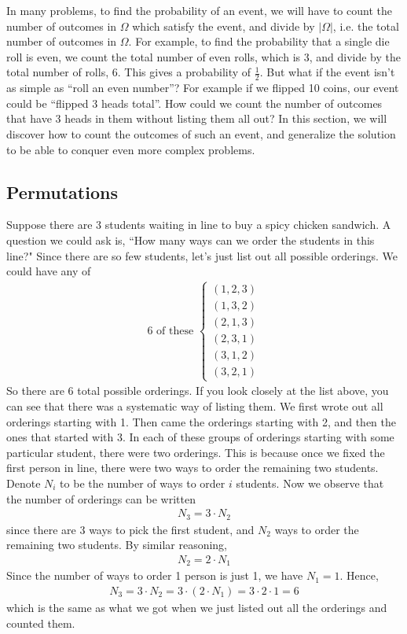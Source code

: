 \documentclass{tufte-book}
\theoremstyle{definition}
\numberwithin{theorem}{section}
\numberwithin{definition}{section}
\numberwithin{lemma}{section}
\numberwithin{corollary}{section}
\numberwithin{proposition}{section}
\numberwithin{remark}{section}
\numberwithin{claim}{section}
\numberwithin{observation}{section}
\numberwithin{fact}{section}
\numberwithin{assumption}{section}
\numberwithin{example}{section}
\numberwithin{exercise}{section}
\begin{document}
In many problems, to find the probability of an event, we will have to count the number of outcomes in $\Omega$ which satisfy the event, and divide by $|\Omega|$, i.e. the total number of outcomes in $\Omega$. For example, to find the probability that a single die roll is even, we count the total number of even rolls, which is 3, and divide by the total number of rolls, 6. This gives a probability of $\frac{1}{2}$. But what if the event isn't as simple as ``roll an even number''? For example if we flipped 10 coins, our event could be ``flipped 3 heads total''. How could we count the number of outcomes that have 3 heads in them without listing them all out? In this section, we will discover how to count the outcomes of such an event, and generalize the solution to be able to conquer even more complex problems.

\subsection{Permutations}
Suppose there are 3 students waiting in line to buy a spicy chicken sandwich. A question we could ask is, ``How many ways can we order the students in this line?" Since there are so few students, let's just list out all possible orderings. We could have any of
\begin{align*}
\text{6 of these }\begin{cases}
(1,2,3) \\
(1,3,2) \\
(2,1,3) \\
(2,3,1) \\
(3,1,2) \\
(3,2,1) 
\end{cases}
\end{align*}
So there are 6 total possible orderings. If you look closely at the list above, you can see that there was a systematic way of listing them. We first wrote out all orderings starting with 1. Then came the orderings starting with 2, and then the ones that started with 3. In each of these groups of orderings starting with some particular student, there were two orderings. This is because once we fixed the first person in line, there were two ways to order the remaining two students. Denote $N_i$ to be the number of ways to order $i$ students. Now we observe that the number of orderings can be written
\begin{align*}
N_3 = 3 \cdot N_2
\end{align*}
since there are 3 ways to pick the first student, and $N_2$ ways to order the remaining two students. By similar reasoning,
\begin{align*}
N_2 = 2 \cdot N_1
\end{align*}
Since the number of ways to order 1 person is just 1, we have $N_1 = 1$. Hence,
\begin{align*}
N_3 = 3 \cdot N_2 = 3 \cdot (2 \cdot N_1) = 3 \cdot 2 \cdot 1 = 6
\end{align*}
which is the same as what we got when we just listed out all the orderings and counted them. 
\end{document}
